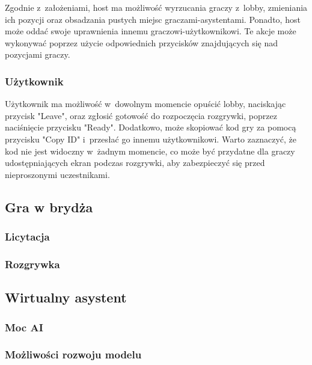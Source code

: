 Zgodnie z~założeniami, host ma możliwość wyrzucania graczy z~lobby, zmieniania ich pozycji 
oraz obsadzania pustych miejsc graczami-asystentami. Ponadto, host może oddać swoje 
uprawnienia innemu graczowi-użytkownikowi. Te akcje może wykonywać poprzez użycie odpowiednich 
przycisków znajdujących się nad pozycjami graczy.

\subsubsection{Użytkownik}

Użytkownik ma możliwość w~dowolnym momencie opuścić lobby, naciskając przycisk "Leave", 
oraz zgłosić gotowość do rozpoczęcia rozgrywki, poprzez naciśnięcie przycisku "Ready". 
Dodatkowo, może skopiować kod gry za pomocą przycisku "Copy ID" i~przesłać go innemu 
użytkownikowi. Warto zaznaczyć, że kod nie jest widoczny w~żadnym momencie, co może być 
przydatne dla graczy udostępniających ekran podczas rozgrywki, aby zabezpieczyć się przed 
nieproszonymi uczestnikami.

\subsection{Gra w brydża}

\subsubsection{Licytacja}
\subsubsection{Rozgrywka}


\subsection{Wirtualny asystent}

\subsubsection{Moc AI}
\label{subsubsec:mocai}

\subsubsection{Możliwości rozwoju modelu}

